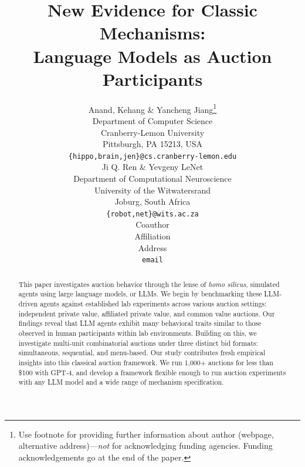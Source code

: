 \documentclass{article} %
\title{New Evidence for Classic Mechanisms: \\Language Models as Auction Participants }
\author{Anand, Kehang \& Yancheng Jiang\thanks{ Use footnote for providing further information
about author (webpage, alternative address)---\emph{not} for acknowledging
funding agencies.  Funding acknowledgements go at the end of the paper.} \\
Department of Computer Science\\
Cranberry-Lemon University\\
Pittsburgh, PA 15213, USA \\
\texttt{\{hippo,brain,jen\}@cs.cranberry-lemon.edu} \\
\And
Ji Q. Ren \& Yevgeny LeNet \\
Department of Computational Neuroscience \\
University of the Witwatersrand \\
Joburg, South Africa \\
\texttt{\{robot,net\}@wits.ac.za} \\
\AND
Coauthor \\
Affiliation \\
Address \\
\texttt{email}
}
\begin{document}
\maketitle

\begin{abstract}
This paper investigates auction behavior through the lense of {\em homo silicus}, simulated agents using large language models, or LLMs. 
We begin by benchmarking these LLM-driven agents against established lab experiments across various auction settings: independent private value, affiliated private value, and common value auctions. Our findings reveal that LLM agents exhibit many behavioral traits similar to those observed in human participants within lab environments.
Building on this, we investigate multi-unit combinatorial auctions under three distinct bid formats: simultaneous, sequential, and menu-based. Our study contributes fresh empirical insights into this classical auction framework.
We run 1,000+ auctions for less than \$100 with GPT-4, and develop a framework flexible enough to run auction experiments with any LLM model and a wide range of mechanism  specification. 

\end{abstract}
\end{document}
